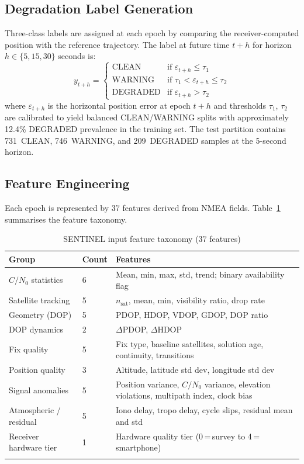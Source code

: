 \documentclass[pdflatex,sn-mathphys-num]{sn-jnl}
\begin{document}
\subsection{Degradation Label Generation}

Three-class labels are assigned at each epoch by comparing the
receiver-computed position with the reference trajectory.  The label at future
time $t{+}h$ for horizon $h \in \{5, 15, 30\}$ seconds is:
\begin{equation}
  y_{t+h} =
  \begin{cases}
    \text{CLEAN}    & \text{if } \varepsilon_{t+h} \leq \tau_1 \\
    \text{WARNING}  & \text{if } \tau_1 < \varepsilon_{t+h} \leq \tau_2 \\
    \text{DEGRADED} & \text{if } \varepsilon_{t+h} > \tau_2
  \end{cases}
\end{equation}
where $\varepsilon_{t+h}$ is the horizontal position error at epoch $t{+}h$
and thresholds $\tau_1$, $\tau_2$ are calibrated to yield balanced
CLEAN/WARNING splits with approximately 12.4\% DEGRADED prevalence in the
training set.  The test partition contains 731~CLEAN, 746~WARNING, and
209~DEGRADED samples at the 5-second horizon.

\subsection{Feature Engineering}

Each epoch is represented by 37 features derived from NMEA fields.
Table~\ref{tab:features} summarises the feature taxonomy.

\begin{table}[h]
\caption{SENTINEL input feature taxonomy (37 features)}\label{tab:features}
\begin{tabular}{@{}llp{5.2cm}@{}}
\toprule
Group & Count & Features \\
\midrule
$C/N_0$ statistics     & 6 & Mean, min, max, std, trend; binary availability flag \\
Satellite tracking     & 5 & $n_\text{sat}$, mean, min, visibility ratio, drop rate \\
Geometry (DOP)         & 5 & PDOP, HDOP, VDOP, GDOP, DOP ratio \\
DOP dynamics           & 2 & $\Delta$PDOP, $\Delta$HDOP \\
Fix quality            & 5 & Fix type, baseline satellites, solution age, continuity, transitions \\
Position quality       & 3 & Altitude, latitude std dev, longitude std dev \\
Signal anomalies       & 5 & Position variance, $C/N_0$ variance, elevation violations, multipath index, clock bias \\
Atmospheric / residual & 5 & Iono delay, tropo delay, cycle slips, residual mean and std \\
Receiver hardware tier & 1 & Hardware quality tier (0\,=\,survey to 4\,=\,smartphone) \\
\botrule
\end{tabular}
\end{table}
\end{document}
